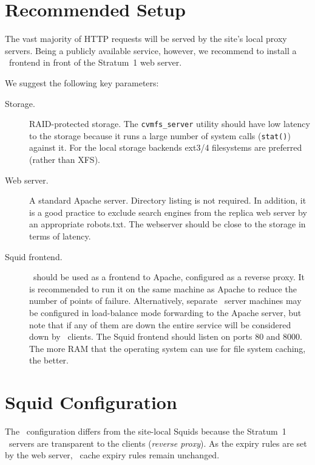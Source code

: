 \section{Recommended Setup}
The vast majority of HTTP requests will be served by the site's local
proxy servers.
Being a publicly available service, however, we recommend to install
a \squid\ frontend in front of the Stratum~1 web server.

We suggest the following key parameters:
\begin{description}
	\item[Storage.] 
		RAID-protected storage.
		The \texttt{cvmfs\_server} utility should have low latency to the storage because it runs a large number of system calls (\texttt{stat()}) against it.
		For the local storage backends ext3/4 filesystems are preferred (rather than XFS).
	\item[Web server.]
		A standard Apache server.
		Directory listing is not required.
		In addition, it is a good practice to exclude search engines from the replica web server by an appropriate robots.txt.
		The webserver should be close to the storage in terms of latency.
	\item[Squid frontend.]
		\squid\ should be used as a frontend to Apache, configured
		as a reverse proxy.  It is recommended to run it on the
		same machine as Apache to reduce the number of points of
		failure.  Alternatively, separate \squid\ server machines
		may be configured in load-balance mode forwarding to the
		Apache server, but note that if any of them are down
		the entire service will be considered down by \cvmfs\
		clients.
		The Squid frontend should listen on ports 80 and 8000.
		The more RAM that the operating system can use for file
		system caching, the better.
\end{description}

\section{Squid Configuration}
The \squid\ configuration differs from the site-local Squids
because the Stratum~1 \squid\ servers are transparent to the clients
(\emph{reverse proxy}).
As the expiry rules are set by the web server, \squid\ cache expiry
rules remain unchanged.

